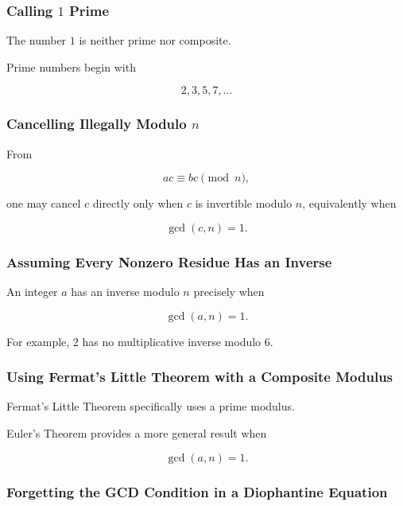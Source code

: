 \subsubsection{Calling \(1\) Prime}

The number \(1\) is neither prime nor composite.

Prime numbers begin with

\[ 2,3,5,7,\ldots \]

\subsubsection{Cancelling Illegally Modulo \(n\)}

From

\[ ac\equiv bc\pmod n, \]

one may cancel \(c\) directly only when \(c\) is invertible modulo \(n\),
equivalently when

\[ \gcd(c,n)=1. \]

\subsubsection{Assuming Every Nonzero Residue Has an Inverse}

An integer \(a\) has an inverse modulo \(n\) precisely when

\[ \gcd(a,n)=1. \]

For example, \(2\) has no multiplicative inverse modulo \(6\).

\subsubsection{Using Fermat's Little Theorem with a Composite Modulus}

Fermat's Little Theorem specifically uses a prime modulus.

Euler's Theorem provides a more general result when

\[ \gcd(a,n)=1. \]

\subsubsection{Forgetting the GCD Condition in a Diophantine Equation}

